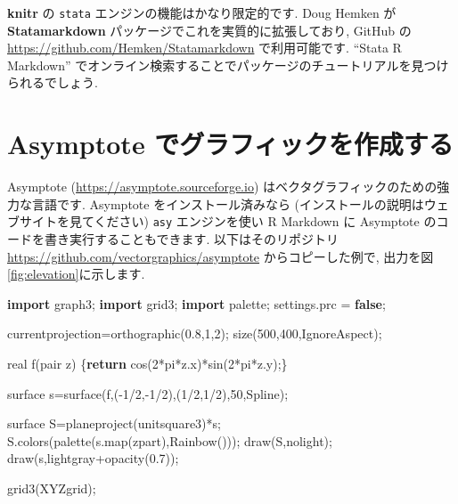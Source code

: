 \documentclass[
  11pt,
]{bxjsreport}
\newenvironment{Shaded}{\begin{snugshade}}{\end{snugshade}}
\newcommand{\ControlFlowTok}[1]{\textcolor[rgb]{0.13,0.29,0.53}{\textbf{#1}}}
\newcommand{\DecValTok}[1]{\textcolor[rgb]{0.00,0.00,0.81}{#1}}
\newcommand{\FloatTok}[1]{\textcolor[rgb]{0.00,0.00,0.81}{#1}}
\newcommand{\KeywordTok}[1]{\textcolor[rgb]{0.13,0.29,0.53}{\textbf{#1}}}
\newcommand{\NormalTok}[1]{#1}
\begin{document}
\textbf{knitr} の \texttt{stata} エンジンの機能はかなり限定的です. Doug Hemken が \textbf{Statamarkdown} パッケージでこれを実質的に拡張しており, GitHub の \url{https://github.com/Hemken/Statamarkdown} で利用可能です. ``Stata R Markdown'' でオンライン検索することでパッケージのチュートリアルを見つけられるでしょう.

\hypertarget{eng-asy}{%
\section{Asymptote でグラフィックを作成する}\label{eng-asy}}

Asymptote (\url{https://asymptote.sourceforge.io}) はベクタグラフィックのための強力な言語です. Asymptote をインストール済みなら (インストールの説明はウェブサイトを見てください) \texttt{asy} エンジンを使い R Markdown に Asymptote のコードを書き実行することもできます. 以下はそのリポジトリ \url{https://github.com/vectorgraphics/asymptote} からコピーした例で, 出力を図\ref{fig:elevation}に示します.

\begin{Shaded}
\begin{Highlighting}[numbers=left,,]
\KeywordTok{import}\NormalTok{ graph3;}
\KeywordTok{import}\NormalTok{ grid3;}
\KeywordTok{import}\NormalTok{ palette;}
\NormalTok{settings.prc = }\KeywordTok{false}\NormalTok{;}

\NormalTok{currentprojection=orthographic(}\FloatTok{0.8}\NormalTok{,}\DecValTok{1}\NormalTok{,}\DecValTok{2}\NormalTok{);}
\NormalTok{size(}\DecValTok{500}\NormalTok{,}\DecValTok{400}\NormalTok{,IgnoreAspect);}

\NormalTok{real f(pair z) \{}\ControlFlowTok{return}\NormalTok{ cos(}\DecValTok{2}\NormalTok{*pi*z.x)*sin(}\DecValTok{2}\NormalTok{*pi*z.y);\}}

\NormalTok{surface s=surface(f,({-}}\DecValTok{1}\NormalTok{/}\DecValTok{2}\NormalTok{,{-}}\DecValTok{1}\NormalTok{/}\DecValTok{2}\NormalTok{),(}\DecValTok{1}\NormalTok{/}\DecValTok{2}\NormalTok{,}\DecValTok{1}\NormalTok{/}\DecValTok{2}\NormalTok{),}\DecValTok{50}\NormalTok{,Spline);}

\NormalTok{surface S=planeproject(unitsquare3)*s;}
\NormalTok{S.colors(palette(s.map(zpart),Rainbow()));}
\NormalTok{draw(S,nolight);}
\NormalTok{draw(s,lightgray+opacity(}\FloatTok{0.7}\NormalTok{));}

\NormalTok{grid3(XYZgrid);}
\end{Highlighting}
\end{Shaded}
\end{document}

